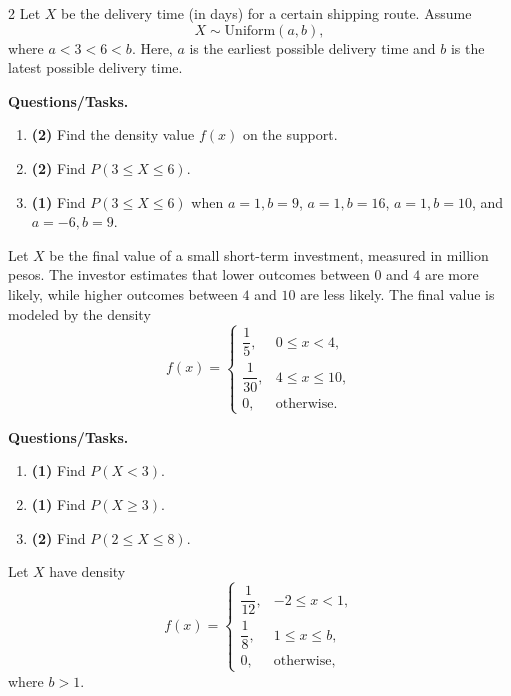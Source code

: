 \begin{multicols}{2}
		\vspace{0.25cm}
		\vspace{-0.3cm}
		Let $X$ be the delivery time (in days) for a certain shipping route. Assume
		\[
		X\sim \text{Uniform}(a,b),
		\]
		where $a<3<6<b$. Here, $a$ is the earliest possible delivery time and $b$ is the latest possible delivery time.
		
		\textbf{Questions/Tasks.}
		\begin{enumerate}[label=\textbf{\alph*)}]
			\item \textbf{(2)} Find the density value $f(x)$ on the support.
			\item \textbf{(2)} Find $P(3\le X\le 6)$.
			\item \textbf{(1)} Find $P(3\le X\le 6)$ when $a=1,b=9$, $a=1,b=16$, $a=1,b=10$, and $a=-6,b=9$.
		\end{enumerate}
		
		\vspace{0.25cm}
		\vspace{-0.3cm}
		Let $X$ be the final value of a small short-term investment, measured in million pesos. The investor estimates that lower outcomes between $0$ and $4$ are more likely, while higher outcomes between $4$ and $10$ are less likely. The final value is modeled by the density
		\[
		f(x)=
		\begin{cases}
			\dfrac{1}{5}, & 0\le x<4,\\
			\dfrac{1}{30}, & 4\le x\le 10,\\
			0, & \text{otherwise.}
		\end{cases}
		\]
		
		\textbf{Questions/Tasks.}
		\begin{enumerate}[label=\textbf{\alph*)}]
			\item \textbf{(1)} Find $P(X < 3)$.
			\item \textbf{(1)} Find $P(X \ge 3)$.
			\item \textbf{(2)} Find $P(2\le X\le 8)$.
		\end{enumerate}
		
		\vspace{0.25cm}
		\vspace{-0.3cm}
		Let $X$ have density
		\[
		f(x)=
		\begin{cases}
			\dfrac{1}{12}, & -2\le x<1,\\[4pt]
			\dfrac{1}{8}, & 1\le x\le b,\\[4pt]
			0, & \text{otherwise,}
		\end{cases}
		\]
		where $b>1$.
		

\end{multicols}
